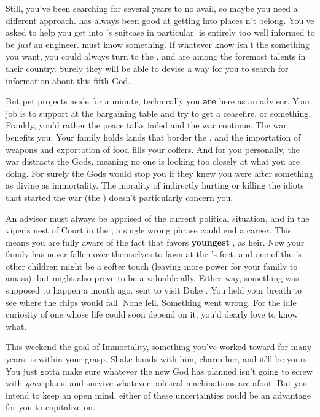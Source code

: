 \documentclass[char]{GL2020}
\begin{document}
Still, you’ve been searching for several years to no avail, so maybe you need a different approach. \cDisney{} has always been good at getting into places  \cDisney{\does}n’t belong. You’ve asked \cDisney{\them} to help you get into \cBunker{}’s suitcase in particular. \cBunker{} is entirely too well informed to be \emph{just} an engineer.  must know something. If whatever \cBunker{\they} know\cBunker{\plural} isn’t the something you want, you could always turn to the \pTech{}. \cHeadScientist{} and \cAssistantScientist{} are among the foremost talents in their country. Surely they will be able to devise a way for you to search for information about this fifth God.

But pet projects aside for a minute, technically you \textbf{are} here as an advisor. Your job is to support \cEvil{} at the bargaining table and try to get a ceasefire, or something. Frankly, you’d rather the peace talks failed and the war continue. The war benefits you. Your family holds lands that border the \pTech{}, and the importation of weapons and exportation of food fills your coffers. And for you personally, the war distracts the Gods, meaning no one is looking too closely at what you are doing. For surely the Gods would stop you if they knew you were after something as divine as immortality. The morality of indirectly hurting or killing the idiots that started the war (the \pShip{}) doesn’t particularly concern you.

An advisor must always be apprised of the current political situation, and in the viper's nest of Court in the \pFarm{}, a single wrong phrase could end a career. This means you are fully aware of the fact that \cQueen{\Majesty} \cQueen{} favors \cQueen{\their} \textbf{youngest} \cPrince{\child}, \cPrince{} as \cQueen{\their} heir. Now your family has never fallen over themselves to fawn at the \cQueen{\Majesty}’s feet, and one of the \cQueen{\Majesty}’s other children might be a softer touch (leaving more power for your family to amass), but \cPrince{} might also prove to be a valuable ally. Either way, something was supposed to happen a month ago. \cQueen{\Majesty} \cQueen{} sent \cPrince{} to visit Duke \cChupStudent{\formal}. You held your breath to see where the chips would fall. None fell. Something went wrong. For the idle curiosity of one whose life could soon depend on it, you’d dearly love to know what.

This weekend the goal of Immortality, something you’ve worked toward for many years, is within your grasp. Shake hands with him, charm her, and it’ll be yours. You just gotta make sure whatever the new God has planned isn’t going to screw with \emph{your} plans, and survive whatever political machinations are afoot. But you intend to keep an open mind, either of these uncertainties could be an advantage for you to capitalize on.
\end{document}
